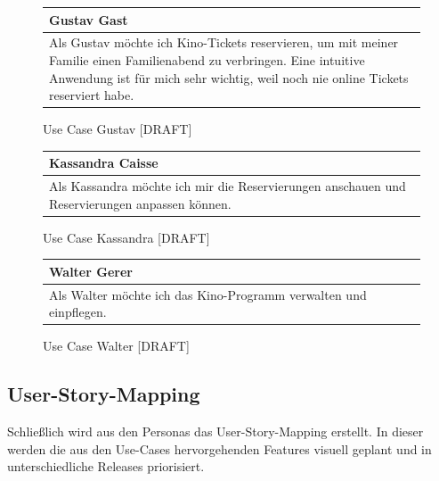 		\begin{figure}[H]
			\begin{tabular}{p{13cm}}
				\textbf{Gustav Gast} \\\toprule
				Als Gustav möchte ich Kino-Tickets reservieren, um mit meiner Familie einen Familienabend zu verbringen. Eine intuitive Anwendung ist für mich sehr wichtig, weil noch nie online Tickets reserviert habe. 
			\end{tabular}
			\caption[Use Case Gustav]{\label{fig:useCaseGustav} Use Case Gustav [DRAFT]}
		\end{figure}
	
		\begin{figure}[H]
			\begin{tabular}{p{13cm}}
				\textbf{Kassandra Caisse} \\\toprule
				Als Kassandra möchte ich mir die Reservierungen anschauen und Reservierungen anpassen können. 
			\end{tabular}
			\caption[Use Case Kassandra]{\label{fig:useCaseKassandra} Use Case Kassandra [DRAFT]}
		\end{figure}

		\begin{figure}[H]
			\begin{tabular}{p{13cm}}
				\textbf{Walter Gerer} \\\toprule
				Als Walter möchte ich das Kino-Programm verwalten und einpflegen. 
			\end{tabular}
			\caption[Use Case Walter]{\label{fig:useCaseWalter} Use Case Walter [DRAFT]}
		\end{figure}
		
	\subsection{User-Story-Mapping}
	Schließlich wird aus den Personas das User-Story-Mapping erstellt. In dieser werden die aus den Use-Cases hervorgehenden Features visuell geplant und in unterschiedliche Releases priorisiert. 

